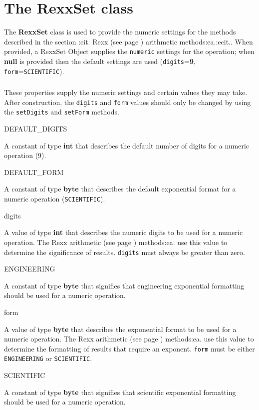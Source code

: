 \chapter{The RexxSet class}\label{"id"}
 
The \textbf{RexxSet} class is used to provide the numeric settings for
the methods described in the section :cit. Rexx (see page \pageref{refrexxops}) 
arithmetic methods:ea.:ecit..
When provided, a RexxSet Object supplies the \texttt{numeric} settings
for the operation; when \textbf{null} is provided then the default
settings are used (\texttt{digits}=\textbf{9},
\texttt{form}=\texttt{SCIENTIFIC}).
\subsection{}\label{"id"}
 
These properties supply the numeric settings and certain values they may
take.  After construction, the \texttt{digits} and \texttt{form} values
should only be changed by using the \texttt{setDigits} and
\texttt{setForm} methods.
\begin{description}
\item{DEFAULT\_DIGITS}

A constant of type \textbf{int} that describes the default number of
digits for a numeric operation (9).
\item{DEFAULT\_FORM}

A constant of type \textbf{byte} that describes the default exponential
format for a numeric operation (\texttt{SCIENTIFIC}).
\item{digits}

A value of type \textbf{int} that describes the numeric digits to be
used for a numeric operation.  The  Rexx arithmetic (see page \pageref{refrexxops}) 
methods:ea. use this value to determine the significance of results.
\texttt{digits} must always be greater than zero.
\item{ENGINEERING}

A constant of type \textbf{byte} that signifies that engineering
exponential formatting should be used for a numeric operation.
\item{form}

A value of type \textbf{byte} that describes the exponential format to
be used for a numeric operation.  The  Rexx arithmetic (see page \pageref{refrexxops}) 
methods:ea. use this value to determine the formatting of results that
require an exponent.
\texttt{form} must be either \texttt{ENGINEERING} or \texttt{SCIENTIFIC}.
\item{SCIENTIFIC}

A constant of type \textbf{byte} that signifies that scientific
exponential formatting should be used for a numeric operation.
\end{description}
